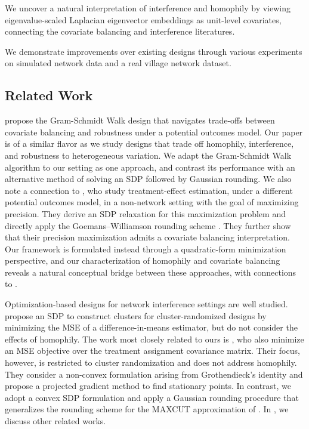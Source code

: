 \documentclass[12pt]{article}
\theoremstyle{definition}
\numberwithin{equation}{section}
\numberwithin{figure}{section}
\numberwithin{equation}{section}
\numberwithin{figure}{section}
\begin{document}
We uncover a natural interpretation of interference and homophily by viewing eigenvalue-scaled Laplacian eigenvector embeddings as unit-level covariates, connecting the covariate balancing and interference literatures.

We demonstrate improvements over existing designs through various experiments on simulated network data and a real village network dataset. 

\subsection{Related Work}
\citet{harshaw2024balancing} propose the Gram-Schmidt Walk design that navigates trade-offs between covariate balancing and robustness under a potential outcomes model. Our paper is of a similar flavor as we study designs that trade off homophily, interference, and robustness to heterogeneous variation. 
We adapt the Gram-Schmidt Walk algorithm to our setting as one approach, and contrast its performance with an alternative method of solving an SDP followed by Gaussian rounding. We also note a connection to \citet{bhat2020near}, who study treatment-effect estimation, under a different potential outcomes model, in a non-network setting with the goal of maximizing precision. They derive an SDP relaxation for this maximization problem and directly apply the Goemans–Williamson rounding scheme \citep{goemans1995improved}. They further show that their precision maximization admits a covariate balancing interpretation.
Our framework is formulated instead through a quadratic-form minimization perspective, and our characterization of homophily and covariate balancing reveals a natural conceptual bridge between these approaches, with connections to .

Optimization-based designs for network interference settings are well studied. \citet{viviano2023causal} propose an SDP to construct clusters for cluster-randomized designs by minimizing the MSE of a difference-in-means estimator, but do not consider the effects of homophily.
The work most closely related to ours is \citet{chen2024optimized}, who also minimize an MSE objective over the treatment assignment covariance matrix. Their focus, however, is restricted to cluster randomization and does not address homophily. They consider a non-convex formulation arising from Grothendieck’s identity and propose a projected gradient method to find stationary points. In contrast, we adopt a convex SDP formulation and apply a Gaussian rounding procedure that generalizes the rounding scheme for the MAXCUT approximation of \citet{goemans1995improved}. In , we discuss other related works.
\end{document}
